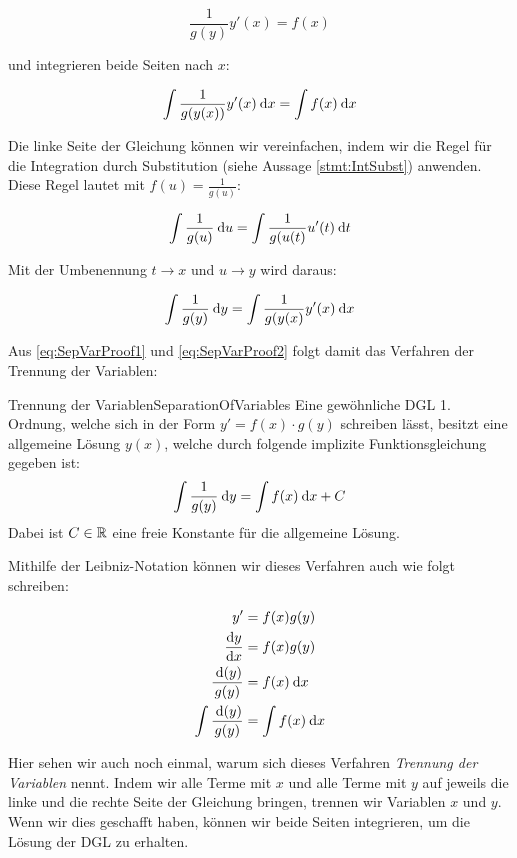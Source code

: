$$
    \frac{1}{g(y)} y'(x) =  f(x)
$$

und integrieren beide Seiten nach $x$:

\begin{equation}
    \int \frac{1}{g(y(x))} y'(x) \:\mathrm{d}{x} =  \int f(x) \:\mathrm{d}{x} \label{eq:SepVarProof1}
\end{equation}

Die linke Seite der Gleichung können wir vereinfachen, indem wir die Regel für die Integration durch Substitution (siehe Aussage \ref{stmt:IntSubst}) anwenden. Diese Regel lautet mit $f(u) = \frac{1}{g(u)}$:

$$
    \int \frac{1}{g(u)} \:\mathrm{d}{u} = \int \frac{1}{g(u(t)} u'(t) \:\mathrm{d}{t}
$$

Mit der Umbenennung $t \to x$ und $u \to y$ wird daraus:

\begin{equation}
    \int \frac{1}{g(y)} \:\mathrm{d}{y} = \int \frac{1}{g(y(x)} y'(x) \:\mathrm{d}{x} \label{eq:SepVarProof2}
\end{equation}

Aus \ref{eq:SepVarProof1} und \ref{eq:SepVarProof2} folgt damit das Verfahren der Trennung der Variablen:

\begin{statement}{Trennung der Variablen}{SeparationOfVariables}
    Eine gewöhnliche DGL 1. Ordnung, welche sich in der Form $y' = f(x) \cdot g(y)$ schreiben lässt, besitzt eine allgemeine Lösung $y(x)$, welche durch folgende implizite Funktionsgleichung gegeben ist:
    $$
        \int \frac{1}{g(y)} \:\mathrm{d}{y} = \int f(x) \:\mathrm{d}{x} + C
    $$
    Dabei ist $C \in \mathbb{R}$ eine freie Konstante für die allgemeine Lösung.
\end{statement}

Mithilfe der Leibniz-Notation können wir dieses Verfahren auch wie folgt schreiben:

\begin{alignat*}{1}
    y'        &= f(x) g(y) \\
    \frac{\mathrm{d}{y}}{\mathrm{d}{x}} &= f(x) g(y) \\
    \frac{\:\mathrm{d}{(}y)}{g(y)}      &= f(x) \:\mathrm{d}{x} \\
    \int \frac{\:\mathrm{d}{(}y)}{g(y)} &= \int f(x) \:\mathrm{d}{x}
\end{alignat*}

Hier sehen wir auch noch einmal, warum sich dieses Verfahren \emph{Trennung der Variablen} nennt. Indem wir alle Terme mit $x$ und alle Terme mit $y$ auf jeweils die linke und die rechte Seite der Gleichung bringen, trennen wir Variablen $x$ und $y$. Wenn wir dies geschafft haben, können wir beide Seiten integrieren, um die Lösung der DGL zu erhalten.

